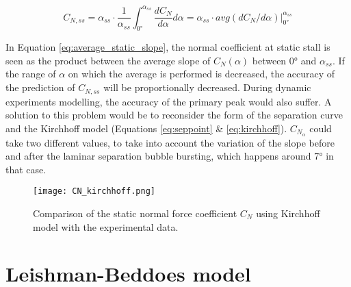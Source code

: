 \begin{equation}
    C_{N,ss} = \alpha_{ss} \cdot \frac{1}{\alpha_{ss}} \int_{\ang{0}}^{\alpha_{ss}} \frac{dC_N}{d\alpha} d\alpha = \alpha_{ss} \cdot avg(dC_N/d\alpha)\Big|_{\ang{0}}^{\alpha_{ss}}
\label{eq:average_static_slope}
\end{equation}

In Equation \eqref{eq:average_static_slope}, the normal coefficient at static stall is seen as the product between the average slope of $C_N(\alpha)$ between $\ang{0}$ and $\alpha_{ss}$. If the range of $\alpha$ on which the average is performed is decreased, the accuracy of the prediction of $C_{N,ss}$ will be proportionally decreased. During dynamic experiments modelling, the accuracy of the primary peak would also suffer. A solution to this problem would be to reconsider the form of the separation curve and the Kirchhoff model (Equations \eqref{eq:seppoint} \& \eqref{eq:kirchhoff}). $C_{N_\alpha}$ could take two different values, to take into account the variation of the slope before and after the laminar separation bubble bursting, which happens around \ang{7} in that case. 

\begin{figure}[h]
	\centering
	\texttt{[image: CN\_kirchhoff.png]}
	\caption{Comparison of the static normal force coefficient $C_N$ using Kirchhoff model with the experimental data.}
	\label{fig:CN_kirchhoff}
\end{figure}


\section{Leishman-Beddoes model}

